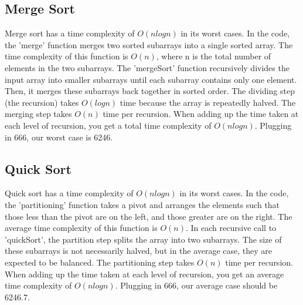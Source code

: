 \documentclass[letterpaper, 10pt,DIV=13]{scrartcl}
\numberwithin{equation}{section} %
\numberwithin{figure}{section} %
\numberwithin{table}{section} %
\begin{document}
\subsection{Merge Sort} 
Merge sort has a time complexity of $O(n log n)$ in its worst cases. In the code, the 'merge' function merges two sorted subarrays into a single sorted array. The time complexity of this function is $O(n)$, where n is the total number of elements in the two subarrays. The 'mergeSort' function recursively divides the input array into smaller subarrays until each subarray contains only one element. Then, it merges these subarrays back together in sorted order. The dividing step (the recursion) takes $O(log n)$ time because the array is repeatedly halved. The merging step takes $O(n)$ time per recursion. When adding up the time taken at each level of recursion, you get a total time complexity of $O(n log n)$. Plugging in 666, our worst case is 6246.
\subsection{Quick Sort} 
Quick sort has a time complexity of $O(n log n)$ in its worst cases. In the code, the 'partitioning' function takes a pivot and arranges the elements such that those less than the pivot are on the left, and those greater are on the right. The average time complexity of this function is $O(n)$. In each recursive call to 'quickSort', the partition step splits the array into two subarrays. The size of these subarrays is not necessarily halved, but in the average case, they are expected to be balanced. The partitioning step takes $O(n)$ time per recursion. When adding up the time taken at each level of recursion, you get an average time complexity of $O(n log n)$. Plugging in 666, our average case should be 6246.7.

\pagebreak
\end{document}
